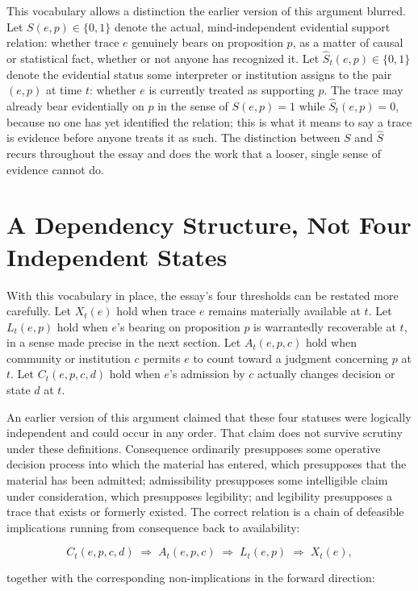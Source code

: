 \documentclass[11pt]{article}
\begin{document}
This vocabulary allows a distinction the earlier version of this argument blurred. Let $S(e,p) \in \{0,1\}$ denote the actual, mind-independent evidential support relation: whether trace $e$ genuinely bears on proposition $p$, as a matter of causal or statistical fact, whether or not anyone has recognized it. Let $\widehat S_t(e,p) \in \{0,1\}$ denote the evidential status some interpreter or institution assigns to the pair $(e,p)$ at time $t$: whether $e$ is currently treated as supporting $p$. The trace may already bear evidentially on $p$ in the sense of $S(e,p)=1$ while $\widehat S_t(e,p)=0$, because no one has yet identified the relation; this is what it means to say a trace is evidence before anyone treats it as such. The distinction between $S$ and $\widehat S$ recurs throughout the essay and does the work that a looser, single sense of evidence cannot do.

\section{A Dependency Structure, Not Four Independent States}

With this vocabulary in place, the essay's four thresholds can be restated more carefully. Let $X_t(e)$ hold when trace $e$ remains materially available at $t$. Let $L_t(e,p)$ hold when $e$'s bearing on proposition $p$ is warrantedly recoverable at $t$, in a sense made precise in the next section. Let $A_t(e,p,c)$ hold when community or institution $c$ permits $e$ to count toward a judgment concerning $p$ at $t$. Let $C_t(e,p,c,d)$ hold when $e$'s admission by $c$ actually changes decision or state $d$ at $t$.

An earlier version of this argument claimed that these four statuses were logically independent and could occur in any order. That claim does not survive scrutiny under these definitions. Consequence ordinarily presupposes some operative decision process into which the material has entered, which presupposes that the material has been admitted; admissibility presupposes some intelligible claim under consideration, which presupposes legibility; and legibility presupposes a trace that exists or formerly existed. The correct relation is a chain of defeasible implications running from consequence back to availability:

\[
C_t(e,p,c,d) \;\Rightarrow\; A_t(e,p,c) \;\Rightarrow\; L_t(e,p) \;\Rightarrow\; X_t(e),
\]

together with the corresponding non-implications in the forward direction:
\end{document}
